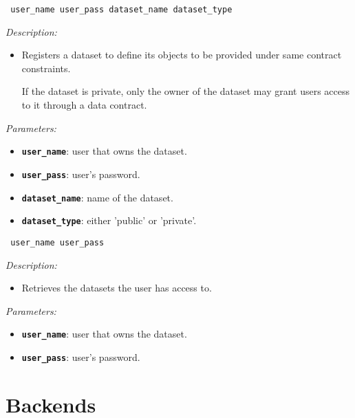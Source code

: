 \begin{dBox}
\texttt{ \newline user\_name user\_pass dataset\_name dataset\_type}
\LINE

{\it Description:}

\begin{itemize}
    \item Registers a dataset to define its objects to be provided under same contract constraints.
    
    If the dataset is private, only the owner of the dataset may grant users access to it through a data contract.
\end{itemize}

{\it Parameters:}

\begin{itemize}
    \item \texttt{\bfseries user\_name}: user that owns the dataset.
    \item \texttt{\bfseries user\_pass}: user's password.
    \item \texttt{\bfseries dataset\_name}: name of the dataset.
    \item \texttt{\bfseries dataset\_type}: either 'public' or 'private'.
\end{itemize}

\end{dBox}

\begin{dBox}
\texttt{ \newline user\_name user\_pass}
\LINE

{\it Description:}

\begin{itemize}
    \item Retrieves the datasets the user has access to.
\end{itemize}

{\it Parameters:}

\begin{itemize}
    \item \texttt{\bfseries user\_name}: user that owns the dataset.
    \item \texttt{\bfseries user\_pass}: user's password.
\end{itemize}

\end{dBox}


\section{Backends}

